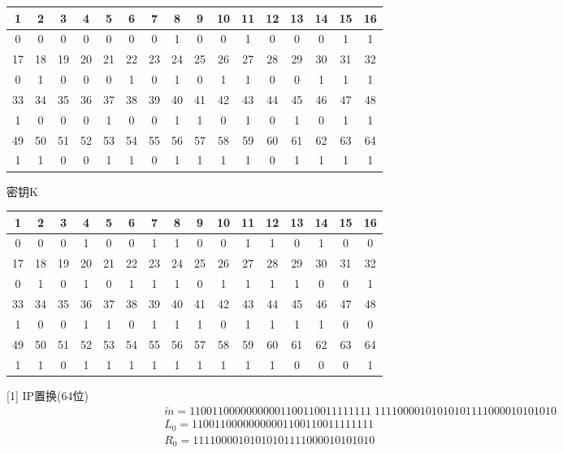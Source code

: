 \documentclass[UTF8]{ctexart}
\begin{document}
    \begin{tabular}{|c|c|c|c|c|c|c|c|c|c|c|c|c|c|c|c|}
        \hline
        1 &2 &3 &4 &5 &6 &7 &8 &9 &10 &11 &12 &13 &14 &15 &16\\
        \hline
        0 &0 &0 &0 &0 &0 &0 &1 &0 &0 &1 &0 &0 &0 &1 &1\\
        \hline
        17 &18 &19 &20 &21 &22 &23 &24 &25 &26 &27 &28 &29 &30 &31 &32\\
        \hline
        0 &1 &0 &0 &0 &1 &0 &1 &0 &1 &1 &0 &0 &1 &1 &1\\
        \hline
        33 &34 &35 &36 &37 &38 &39 &40 &41 &42 &43 &44 &45 &46 &47 &48\\
        \hline
        1 &0 &0 &0 &1 &0 &0 &1 &1 &0 &1 &0 &1 &0 &1 &1\\
        \hline
        49 &50 &51 &52 &53 &54 &55 &56 &57 &58 &59 &60 &61 &62 &63 &64\\
        \hline
        1 &1 &0 &0 &1 &1 &0 &1 &1 &1 &1 &0 &1 &1 &1 &1\\
        \hline
    \end{tabular}

    密钥K

    \begin{tabular}{|c|c|c|c|c|c|c|c|c|c|c|c|c|c|c|c|}
        \hline
        1 &2 &3 &4 &5 &6 &7 &8 &9 &10 &11 &12 &13 &14 &15 &16\\
        \hline
        0 &0 &0 &1 &0 &0 &1 &1 &0 &0 &1 &1 &0 &1 &0 &0\\
        \hline
        17 &18 &19 &20 &21 &22 &23 &24 &25 &26 &27 &28 &29 &30 &31 &32\\
        \hline
        0 &1 &0 &1 &0 &1 &1 &1 &0 &1 &1 &1 &1 &0 &0 &1\\
        \hline
        33 &34 &35 &36 &37 &38 &39 &40 &41 &42 &43 &44 &45 &46 &47 &48\\
        \hline
        1 &0 &0 &1 &1 &0 &1 &1 &1 &0 &1 &1 &1 &1 &0 &0\\
        \hline
        49 &50 &51 &52 &53 &54 &55 &56 &57 &58 &59 &60 &61 &62 &63 &64\\
        \hline
        1 &1 &0 &1 &1 &1 &1 &1 &1 &1 &1 &1 &0 &0 &0 &1\\
        \hline
    \end{tabular}

    [1] IP置换(64位)
    $$
    \begin{aligned}
        &\widetilde{m}=11001100000000001100110011111111\; 11110000101010101111000010101010\\
        &L_0=11001100000000001100110011111111\\
        &R_0=11110000101010101111000010101010
    \end{aligned}
    $$
\end{document}
